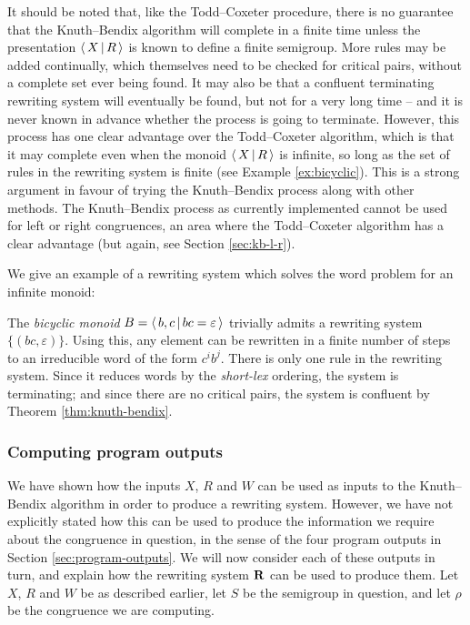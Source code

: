 It should be noted that, like the Todd--Coxeter procedure, there is no guarantee
that the Knuth--Bendix algorithm will complete in a finite time unless the presentation
$\left\langle \, X \, \middle| \, R \, \right\rangle$ is known to define a finite semigroup.  More rules may be added continually, which
themselves need to be checked for critical pairs, without a complete set ever
being found.  It may also be that a confluent terminating rewriting system will
eventually be found, but not for a very long time -- and it is never known in
advance whether the process is going to terminate.  However, this process has
one clear advantage over the Todd--Coxeter algorithm, which is that it may complete even when
the monoid $\left\langle \, X \, \middle| \, R \, \right\rangle$ is infinite, so long as the set of rules in the rewriting
system is finite (see Example \ref{ex:bicyclic}).  This is a strong argument in
favour of trying the Knuth--Bendix process along with other methods.  The
Knuth--Bendix process as currently implemented cannot be used for left or right
congruences, an area where the Todd--Coxeter algorithm has a clear advantage (but again, see
Section \ref{sec:kb-l-r}).

We give an example of a rewriting system which solves the word problem for an
infinite monoid:

\begin{example}
  \label{ex:bicyclic}
  The \textit{bicyclic monoid} $B = \left\langle \, b,c \, \middle| \, bc=\varepsilon \, \right\rangle$ trivially admits
  a rewriting system $\{(bc, \varepsilon)\}$.  Using this, any element can be
  rewritten in a finite number of steps to an irreducible word of the form
  $c^ib^j$.  There is only one rule in the rewriting system.  Since it reduces
  words by the \textit{short-lex} ordering, the system is terminating; and since
  there are no critical pairs, the system is confluent by Theorem
  \ref{thm:knuth-bendix}.
\end{example}

\subsubsection{Computing program outputs}
\label{sec:kb-output}
We have shown how the inputs $X$, $R$ and $W$ can be used as inputs to the
Knuth--Bendix algorithm in order to produce a rewriting system.  However, we
have not explicitly stated how this can be used to produce the information we
require about the congruence in question, in the sense of the four program
outputs in Section \ref{sec:program-outputs}.  We will now consider each of
these outputs in turn, and explain how the rewriting system $\mathbf{R}$ can be used
to produce them.  Let $X$, $R$ and $W$ be as described earlier, let $S$ be the
semigroup in question, and let $\rho$ be the congruence we are computing.

